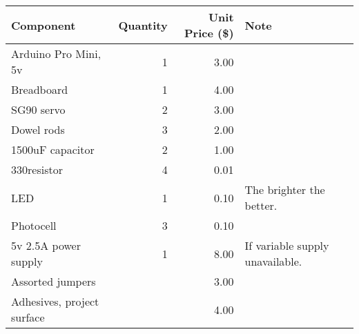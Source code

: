 \documentclass{article}
\begin{document}
	\begin{center}
		\begin{tabular}{ l r r  p{5cm} }
			\hline
			Component & Quantity & Unit Price (\$) & Note \\ \hline
			Arduino Pro Mini, 5v & 1 & 3.00 &  \\ 
			Breadboard & 1 & 4.00 & \\
			SG90 servo & 2 & 3.00 & \\ 
			Dowel rods & 3 & 2.00 & \\
			1500uF capacitor & 2 & 1.00 & \\ 
			330\ohm\space resistor & 4 & 0.01 \\
			LED & 1 & 0.10 & The brighter the better.\\ 
			Photocell & 3 & 0.10 & \\ 
			5v 2.5A power supply & 1 & 8.00 & If variable supply unavailable. \\ 
			Assorted jumpers & & 3.00 & \\
			Adhesives, project surface & & 4.00 & \\
			\hline
		\end{tabular}
	\end{center}
	
	
\end{document}

